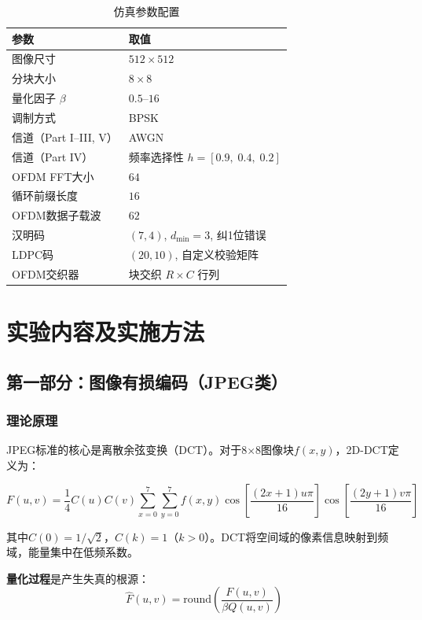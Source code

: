 \documentclass[12pt, a4paper]{article}
\begin{document}
\begin{table}[h]
\centering
\caption{仿真参数配置}
\label{tab:params_zh}
\begin{tabular}{ll}
\toprule
参数 & 取值 \\
\midrule
图像尺寸 & $512\times512$ \\
分块大小 & $8\times8$ \\
量化因子 $\beta$ & $0.5$--$16$ \\
调制方式 & BPSK \\
信道（Part I--III, V） & AWGN \\
信道（Part IV） & 频率选择性 $h=[0.9,\;0.4,\;0.2]$ \\
OFDM FFT大小 & $64$ \\
循环前缀长度 & $16$ \\
OFDM数据子载波 & $62$ \\
汉明码 & $(7,4)$, $d_{\min}=3$, 纠1位错误 \\
LDPC码 & $(20,10)$, 自定义校验矩阵 \\
OFDM交织器 & 块交织 $R\times C$ 行列 \\
\bottomrule
\end{tabular}
\end{table}

\section{实验内容及实施方法}

\subsection{第一部分：图像有损编码（JPEG类）}

\subsubsection{理论原理}

JPEG标准的核心是离散余弦变换（DCT）。对于8$\times$8图像块$f(x,y)$，2D-DCT定义为：

\begin{equation}
F(u,v)=\frac{1}{4}C(u)C(v)\sum_{x=0}^{7}\sum_{y=0}^{7}f(x,y)\cos\left[\frac{(2x+1)u\pi}{16}\right]\cos\left[\frac{(2y+1)v\pi}{16}\right]
\label{eq:dct}
\end{equation}

其中$C(0)=1/\sqrt{2}$，$C(k)=1$（$k>0$）。DCT将空间域的像素信息映射到频域，能量集中在低频系数。

\textbf{量化过程}是产生失真的根源：
\begin{equation}
\hat{F}(u,v) = \text{round}\left(\frac{F(u,v)}{\beta Q(u,v)}\right)
\label{eq:quant}
\end{equation}
\end{document}
